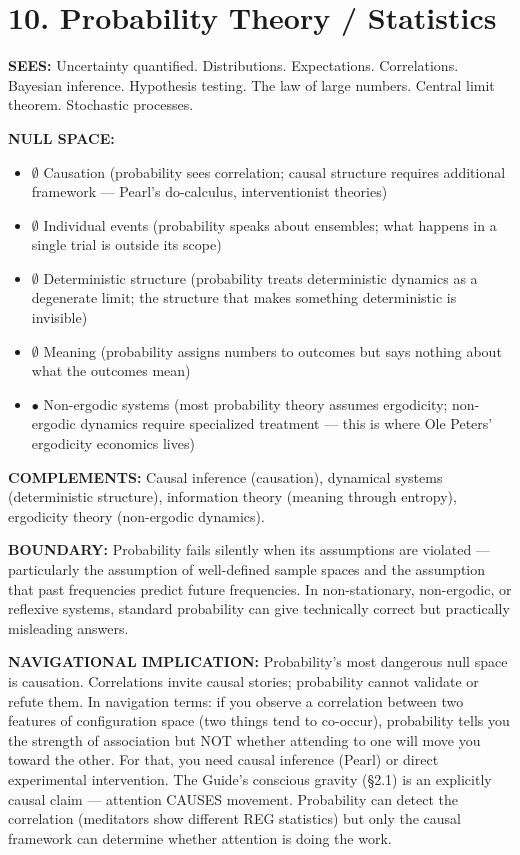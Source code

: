 \bigskip\noindent\makebox[\textwidth]{\color{rulegray}\rule{5cm}{0.3pt}}\bigskip


\section*{10. Probability Theory / Statistics}


\textbf{SEES:} Uncertainty quantified. Distributions. Expectations. Correlations. Bayesian inference. Hypothesis testing. The law of large numbers. Central limit theorem. Stochastic processes.


\textbf{NULL SPACE:}

\begin{itemize}[nosep,leftmargin=*]
  \item $\emptyset$ Causation (probability sees correlation; causal structure requires additional framework — Pearl's do-calculus, interventionist theories)
  \item $\emptyset$ Individual events (probability speaks about ensembles; what happens in a single trial is outside its scope)
  \item $\emptyset$ Deterministic structure (probability treats deterministic dynamics as a degenerate limit; the structure that makes something deterministic is invisible)
  \item $\emptyset$ Meaning (probability assigns numbers to outcomes but says nothing about what the outcomes mean)
  \item $\bullet$ Non-ergodic systems (most probability theory assumes ergodicity; non-ergodic dynamics require specialized treatment — this is where Ole Peters' ergodicity economics lives)
\end{itemize}


\textbf{COMPLEMENTS:} Causal inference (causation), dynamical systems (deterministic structure), information theory (meaning through entropy), ergodicity theory (non-ergodic dynamics).


\textbf{BOUNDARY:} Probability fails silently when its assumptions are violated — particularly the assumption of well-defined sample spaces and the assumption that past frequencies predict future frequencies. In non-stationary, non-ergodic, or reflexive systems, standard probability can give technically correct but practically misleading answers.


\textbf{NAVIGATIONAL IMPLICATION:} Probability's most dangerous null space is causation. Correlations invite causal stories; probability cannot validate or refute them. In navigation terms: if you observe a correlation between two features of configuration space (two things tend to co-occur), probability tells you the strength of association but NOT whether attending to one will move you toward the other. For that, you need causal inference (Pearl) or direct experimental intervention. The Guide's conscious gravity (§2.1) is an explicitly causal claim — attention CAUSES movement. Probability can detect the correlation (meditators show different REG statistics) but only the causal framework can determine whether attention is doing the work.


